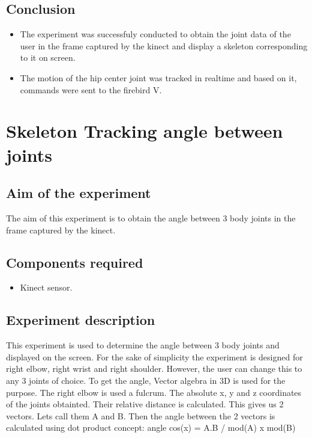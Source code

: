 \begin{flushleft}
\subsection{\textbf{ Conclusion}}
\begin{itemize}
\item The experiment was successfuly conducted to obtain the joint data of the user in the frame captured by the kinect and display a skeleton corresponding to it on screen.
\item The motion of the hip center joint was tracked in realtime and based on it, commands were sent to the firebird V.
\end{itemize}
\medskip

\newpage

\section{\textbf{ Skeleton Tracking angle between joints}}
\label{4.7}

\medskip
\subsection{\textbf{ Aim of the experiment}}
The aim of this experiment is to obtain the angle between 3 body joints in the frame captured by the kinect.
\medskip

\subsection{\textbf{ Components required}}
\begin{itemize}
\item Kinect sensor.
 \end{itemize}
\medskip

\subsection{\textbf{ Experiment description}}
This experiment is used to determine the angle between 3 body joints and displayed on the screen. For the sake of simplicity the experiment is designed for right elbow, right wrist and right shoulder. However, the user can change this to any 3 joints of choice. To get the angle, Vector algebra in 3D is used for the purpose. The right elbow is used a fulcrum. The absolute x, y and z coordinates of the joints obtainted. Their relative distance is calculated. This gives us 2 vectors. Lets call them A and B. Then the angle between the 2 vectors is calculated using dot product concept:
        angle cos(x) = A.B / mod(A) x mod(B)


\end{flushleft}
